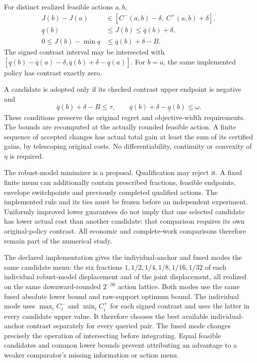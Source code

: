 \begin{theorem}
\label{thm:memorypolicy123}
For distinct realized feasible actions $a,b$,
\begin{align}
 J(b)-J(a)&\in[C^-(a,b)-\delta,\ C^+(a,b)+\delta],\nonumber\\
 \underline q(b)&\le J(b)\le\overline q(b)+\delta,\label{eq:memorypolicy123}\\
 0\le J(b)-\min q&\le\overline q(b)+\delta-B.\nonumber
\end{align}
The signed contrast interval may be intersected with
$[\underline q(b)-\overline q(a)-\delta,
\overline q(b)+\delta-\underline q(a)]$.
For $b=a$, the same implemented policy has contrast exactly zero.

A candidate is adopted only if its checked contrast upper endpoint is
negative and
\begin{equation}\label{eq:memorygate123}
 \overline q(b)+\delta-B\le\tau,
 \qquad
 \overline q(b)+\delta-\underline q(b)\le\omega.
\end{equation}
These conditions preserve the original regret and objective-width
requirements. The bounds are recomputed at the actually rounded feasible
action. A finite sequence of accepted changes has actual total gain at
least the sum of its certified gains, by telescoping original costs.
No differentiability, continuity or convexity of $\eta$ is required.
\end{theorem}

The robust-model minimizer is a proposal. Qualification may reject it.
A fixed finite menu can additionally contain prescribed fractions,
feasible endpoints, envelope switchpoints and previously completed
qualified actions. The implemented rule and its ties must be frozen
before an independent experiment. Uniformly improved lower guarantees
do not imply that one selected candidate has lower actual cost than
another candidate: that comparison requires its own original-policy
contrast. All economic and complete-work comparisons therefore remain
part of the numerical study.

The declared implementation gives the individual-anchor and fused modes
the same candidate menu: the six fractions
$1,1/2,1/4,1/8,1/16,1/32$ of each individual robust-model displacement
and of the joint displacement, all realized on the same downward-rounded
$2^{-30}$ action lattice. Both modes use the same fused absolute lower
bound and raw-support optimum bound. The individual mode uses
$\max_i C_i^-$ and $\min_i C_i^+$ for each signed contrast and uses
the latter in every candidate upper value. It therefore chooses the
best available individual-anchor contrast separately for every queried
pair. The fused mode changes precisely the operation of intersecting
before integrating. Equal feasible candidates and common lower bounds
prevent attributing an advantage to a weaker comparator's missing
information or action menu.

